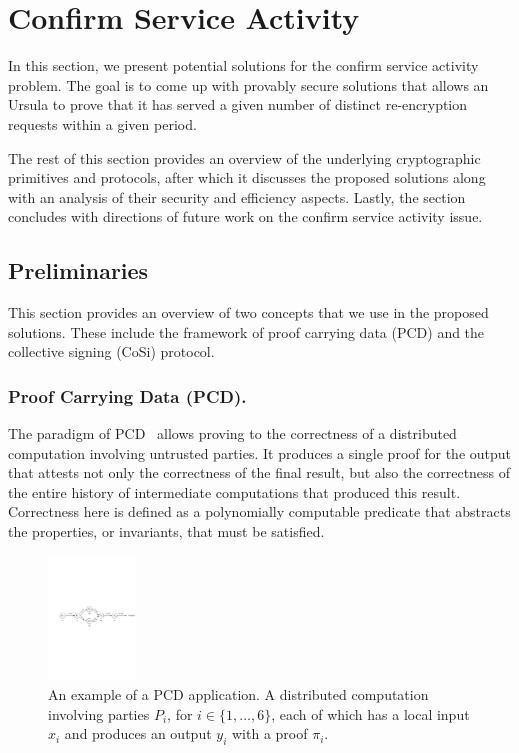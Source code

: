 \section{Confirm Service Activity}
\label{confirm-service-activity}
In this section, we present potential solutions for the confirm service activity 
problem. The goal is to come up with provably secure solutions that allows an 
Ursula to prove that it has served a given number of distinct re-encryption 
requests within a given period. 


The rest of this section provides an overview of the underlying cryptographic primitives and 
protocols, after which it discusses the proposed solutions along with an analysis of 
their security and efficiency aspects. Lastly, the section concludes with directions of 
future work on the confirm service activity issue.


\subsection{Preliminaries}
\label{prelim}
This section provides an overview of two concepts that we use in the 
proposed solutions. These include the framework of proof carrying data (PCD) 
and the collective signing (CoSi) protocol.


\subsubsection{Proof Carrying Data (PCD).}
The paradigm of PCD~\cite{chiesa2010proof} allows proving to the correctness of a distributed 
computation involving untrusted parties. It produces a single proof for the output 
that attests not only the correctness of the final result, but also 
the correctness of the entire history of intermediate computations that produced 
this result. Correctness here is defined as a polynomially computable predicate that 
abstracts the properties, or invariants, that must be satisfied.


\begin{figure}[h!]
\centerline{
\includegraphics[height= 1.3in, width = 1.0\columnwidth]{figures/pcd-diagram.pdf}}
\caption{An example of a PCD application. A distributed computation involving parties $P_i$, for 
$i \in \{1, \dots, 6\}$, each 
of which has a local input $x_i$ and produces an output $y_i$ with a proof $\pi_i$. }
\label{pcd-diagram}
\end{figure}


